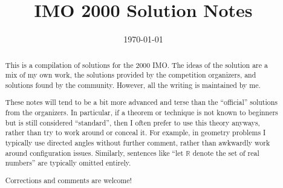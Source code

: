 \documentclass[11pt]{scrartcl}
\title{IMO 2000 Solution Notes}
\date{\today}
\begin{document}
\maketitle

\begin{abstract}
This is a compilation of solutions
for the 2000 IMO.
The ideas of the solution are a mix of my own work,
the solutions provided by the competition organizers,
and solutions found by the community.
However, all the writing is maintained by me.

These notes will tend to be a bit more advanced and terse than the ``official''
solutions from the organizers.
In particular, if a theorem or technique is not known to beginners
but is still considered ``standard'', then I often prefer to
use this theory anyways, rather than try to work around or conceal it.
For example, in geometry problems I typically use directed angles
without further comment, rather than awkwardly work around configuration issues.
Similarly, sentences like ``let $\mathbb{R}$ denote the set of real numbers''
are typically omitted entirely.

Corrections and comments are welcome!
\end{abstract}

\tableofcontents
\newpage

\addtocounter{section}{-1}
\end{document}
